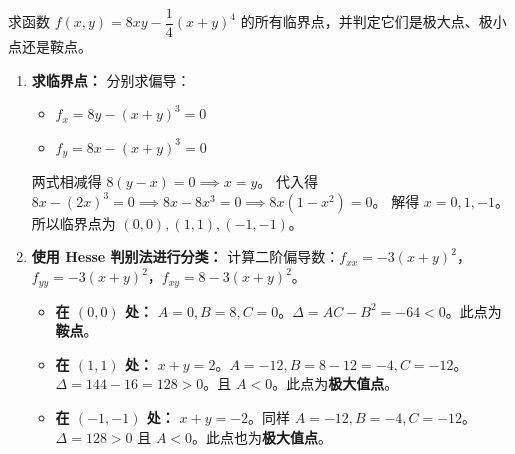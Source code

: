 \documentclass[lang=cn,11pt]{elegantbook}
\begin{document}
\begin{exercise}[临界点的分类]
求函数 $f(x,y)=8xy-\dfrac{1}{4}(x+y)^4$ 的所有临界点，并判定它们是极大点、极小点还是鞍点。
\end{exercise}
\begin{solution}
\begin{enumerate}
  \item \textbf{求临界点：}
  分别求偏导：
  \begin{itemize}
    \item $f_x = 8y - (x+y)^3 = 0$
    \item $f_y = 8x - (x+y)^3 = 0$
  \end{itemize}
  两式相减得 $8(y-x) = 0 \implies x=y$。
  代入得 $8x - (2x)^3 = 0 \implies 8x - 8x^3 = 0 \implies 8x(1-x^2) = 0$。
  解得 $x=0, 1, -1$。
  所以临界点为 $(0,0), (1,1), (-1,-1)$。

  \item \textbf{使用 Hesse 判别法进行分类：}
  计算二阶偏导数：$f_{xx} = -3(x+y)^2$，$f_{yy} = -3(x+y)^2$，$f_{xy} = 8 - 3(x+y)^2$。
  \begin{itemize}
    \item \textbf{在 $(0,0)$ 处：} $A=0, B=8, C=0$。$\Delta = AC-B^2 = -64 < 0$。此点为\textbf{鞍点}。
    \item \textbf{在 $(1,1)$ 处：} $x+y=2$。$A=-12, B=8-12=-4, C=-12$。$\Delta = 144 - 16 = 128 > 0$。且 $A < 0$。此点为\textbf{极大值点}。
    \item \textbf{在 $(-1,-1)$ 处：} $x+y=-2$。同样 $A=-12, B=-4, C=-12$。$\Delta = 128 > 0$ 且 $A < 0$。此点也为\textbf{极大值点}。
  \end{itemize}
\end{enumerate}
\end{solution}
\end{document}
